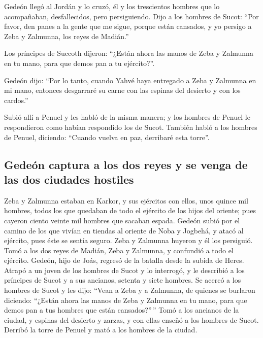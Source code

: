 \begin{paracol}{2}
 Gedeón llegó al Jordán y lo cruzó, él y los trescientos
hombres que lo acompañaban, desfallecidos, pero persiguiendo.
 Dijo a los hombres de Sucot: ``Por favor, den panes a la
gente que me sigue, porque están cansados, y yo persigo a Zeba y
Zalmunna, los reyes de Madián.''

 Los príncipes de Succoth dijeron: ``¿Están ahora las
manos de Zeba y Zalmunna en tu mano, para que demos pan a tu
ejército?''.

 Gedeón dijo: ``Por lo tanto, cuando Yahvé haya entregado
a Zeba y Zalmunna en mi mano, entonces desgarraré su carne con las
espinas del desierto y con los cardos.''

 Subió allí a Penuel y les habló de la misma manera; y los
hombres de Penuel le respondieron como habían respondido los de Sucot.
 También habló a los hombres de Penuel, diciendo: ``Cuando
vuelva en paz, derribaré esta torre''.

\hypertarget{gedeuxf3n-captura-a-los-dos-reyes-y-se-venga-de-las-dos-ciudades-hostiles}{%
\subsection{Gedeón captura a los dos reyes y se venga de las dos
ciudades
hostiles}\label{gedeuxf3n-captura-a-los-dos-reyes-y-se-venga-de-las-dos-ciudades-hostiles}}

 Zeba y Zalmunna estaban en Karkor, y sus ejércitos con
ellos, unos quince mil hombres, todos los que quedaban de todo el
ejército de los hijos del oriente; pues cayeron ciento veinte mil
hombres que sacaban espada.  Gedeón subió por el camino
de los que vivían en tiendas al oriente de Noba y Jogbehá, y atacó al
ejército, pues éste se sentía seguro.  Zeba y Zalmunna
huyeron y él los persiguió. Tomó a los dos reyes de Madián, Zeba y
Zalmunna, y confundió a todo el ejército.  Gedeón, hijo
de Joás, regresó de la batalla desde la subida de Heres. 
Atrapó a un joven de los hombres de Sucot y lo interrogó, y le describió
a los príncipes de Sucot y a sus ancianos, setenta y siete hombres.
 Se acercó a los hombres de Sucot y les dijo: ``Vean a
Zeba y a Zalmunna, de quienes se burlaron diciendo: ``¿Están ahora las
manos de Zeba y Zalmunna en tu mano, para que demos pan a tus hombres
que están cansados?''\,''  Tomó a los ancianos de la
ciudad, y espinas del desierto y zarzas, y con ellas enseñó a los
hombres de Sucot.  Derribó la torre de Penuel y mató a
los hombres de la ciudad.


\end{paracol}

